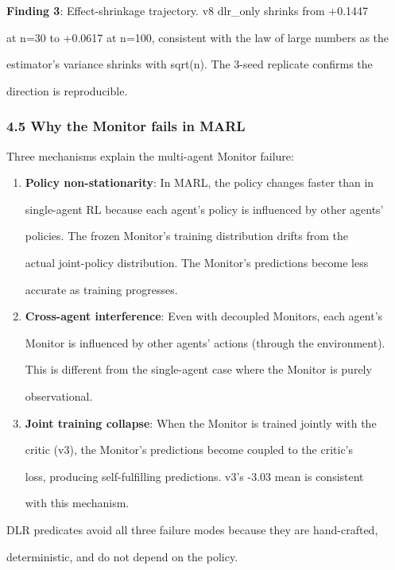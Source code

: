\documentclass[11pt]{article}
\begin{document}
\textbf{Finding 3}: Effect-shrinkage trajectory. v8 dlr\_only shrinks
from +0.1447

at n=30 to +0.0617 at n=100, consistent with the law of large numbers as
the

estimator's variance shrinks with sqrt(n). The 3-seed replicate confirms
the

direction is reproducible.

\subsubsection{4.5 Why the Monitor fails in
MARL}\label{why-the-monitor-fails-in-marl}

Three mechanisms explain the multi-agent Monitor failure:

\begin{enumerate}
\def\labelenumi{\arabic{enumi}.}
\item
  \textbf{Policy non-stationarity}: In MARL, the policy changes faster
  than in

  single-agent RL because each agent's policy is influenced by other
  agents'

  policies. The frozen Monitor's training distribution drifts from the

  actual joint-policy distribution. The Monitor's predictions become
  less

  accurate as training progresses.
\item
  \textbf{Cross-agent interference}: Even with decoupled Monitors, each
  agent's

  Monitor is influenced by other agents' actions (through the
  environment).

  This is different from the single-agent case where the Monitor is
  purely

  observational.
\item
  \textbf{Joint training collapse}: When the Monitor is trained jointly
  with the

  critic (v3), the Monitor's predictions become coupled to the critic's

  loss, producing self-fulfilling predictions. v3's -3.03 mean is
  consistent

  with this mechanism.
\end{enumerate}

DLR predicates avoid all three failure modes because they are
hand-crafted,

deterministic, and do not depend on the policy.
\end{document}
